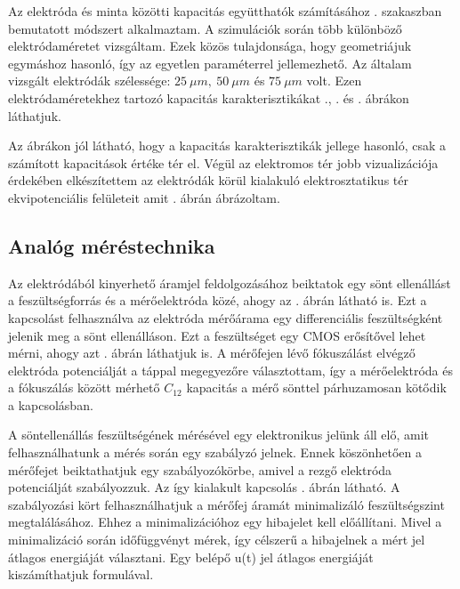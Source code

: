 Az elektróda és minta közötti kapacitás együtthatók számításához . szakaszban bemutatott módszert alkalmaztam. A szimulációk során több különböző elektródaméretet vizsgáltam. Ezek közös tulajdonsága, hogy geometriájuk egymáshoz hasonló, így az egyetlen paraméterrel jellemezhető. Az általam vizsgált elektródák szélessége: $25\ \mu m,\ 50\ \mu m$ és $75\ \mu m$ volt. Ezen elektródaméretekhez tartozó kapacitás karakterisztikákat ., . és . ábrákon láthatjuk.


Az ábrákon jól látható, hogy a kapacitás karakterisztikák jellege hasonló, csak a számított kapacitások értéke tér el. Végül az elektromos tér jobb vizualizációja érdekében elkészítettem az elektródák körül kialakuló elektrosztatikus tér ekvipotenciális felületeit amit . ábrán ábrázoltam.


\subsection{Analóg méréstechnika}

Az elektródából kinyerhető áramjel feldolgozásához beiktatok egy sönt ellenállást a feszültségforrás és a mérőelektróda közé, ahogy az . ábrán látható is. Ezt a kapcsolást felhasználva az elektróda mérőárama egy differenciális feszültségként jelenik meg a sönt ellenálláson. Ezt a feszültséget egy CMOS erősítővel lehet mérni, ahogy azt . ábrán láthatjuk is. A mérőfejen lévő fókuszálást elvégző elektróda potenciálját a táppal megegyezőre választottam, így a mérőelektróda és a fókuszálás között mérhető $C_{12}$ kapacitás a mérő sönttel párhuzamosan kötődik a kapcsolásban.

A söntellenállás feszültségének mérésével egy elektronikus jelünk áll elő, amit felhasználhatunk a mérés során egy szabályzó jelnek. Ennek köszönhetően a mérőfejet beiktathatjuk egy szabályozókörbe, amivel a rezgő elektróda potenciálját szabályozzuk. Az így kialakult kapcsolás . ábrán látható. A szabályozási kört felhasználhatjuk a mérőfej áramát minimalizáló feszültségszint megtalálásához. Ehhez a minimalizációhoz egy hibajelet kell előállítani. Mivel a minimalizáció során időfüggvényt mérek, így célszerű a hibajelnek a mért jel átlagos energiáját választani. Egy belépő u(t) jel átlagos energiáját kiszámíthatjuk  formulával.

